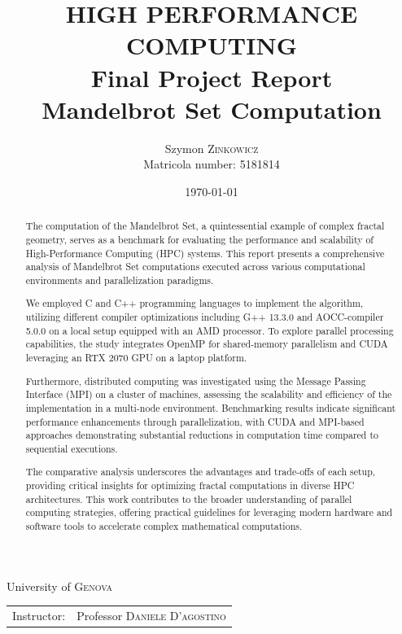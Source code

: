 \documentclass[
	report, %
	11pt, %
]{CSUniSchoolLabReport}
\newcounter{ct}
\begin{document}
\title{HIGH PERFORMANCE COMPUTING \\
	\large Final Project Report \\
	Mandelbrot Set
	Computation} %
\author{Szymon \textsc{Zinkowicz} \\ Matricola number: 5181814} %
\date{\today} %

\maketitle %
\thispagestyle{empty}

\begin{center}
	\vspace{\fill}
	University of \textsc{Genova} \\
	\begin{tabular}{l r}
		Instructor: & Professor \textsc{Daniele D'agostino}
	\end{tabular}
\end{center}
\pagebreak



\begin{abstract}
	\thispagestyle{empty}The computation of the Mandelbrot Set, a quintessential example of complex fractal geometry, serves as a benchmark for evaluating the performance and scalability of High-Performance Computing (HPC) systems. This report presents a comprehensive analysis of Mandelbrot Set computations executed across various computational environments and parallelization paradigms.

	We employed C and C++ programming languages to implement the algorithm, utilizing different compiler optimizations including G++ 13.3.0 and AOCC-compiler 5.0.0 on a local setup equipped with an AMD processor. To explore parallel processing capabilities, the study integrates OpenMP for shared-memory parallelism and CUDA leveraging an RTX 2070 GPU on a laptop platform.

	Furthermore, distributed computing was investigated using the Message Passing Interface (MPI) on a cluster of machines, assessing the scalability and efficiency of the implementation in a multi-node environment. Benchmarking results indicate significant performance enhancements through parallelization, with CUDA and MPI-based approaches demonstrating substantial reductions in computation time compared to sequential executions.


	The comparative analysis underscores the advantages and trade-offs of each setup, providing critical insights for optimizing fractal computations in diverse HPC architectures. This work contributes to the broader understanding of parallel computing strategies, offering practical guidelines for leveraging modern hardware and software tools to accelerate complex mathematical computations.
\end{abstract}
\pagebreak
\end{document}

